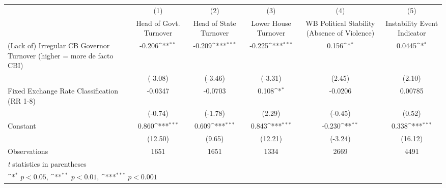 {
\def\sym#1{\ifmmode^{#1}\else\(^{#1}\)\fi}
\begin{tabular}{l*{5}{c}}
\hline\hline
                &\multicolumn{1}{c}{(1)}&\multicolumn{1}{c}{(2)}&\multicolumn{1}{c}{(3)}&\multicolumn{1}{c}{(4)}&\multicolumn{1}{c}{(5)}\\
                &\multicolumn{1}{c}{Head of Govt. Turnover}&\multicolumn{1}{c}{Head of State Turnover}&\multicolumn{1}{c}{Lower House Turnover}&\multicolumn{1}{c}{WB Political Stability (Absence of Violence)}&\multicolumn{1}{c}{Instability Event Indicator}\\
\hline
(Lack of) Irregular CB Governor Turnover (higher = more de facto CBI)&   -0.206\sym{**} &   -0.209\sym{***}&   -0.225\sym{***}&    0.156\sym{*}  &   0.0445\sym{*}  \\
                &  (-3.08)         &  (-3.46)         &  (-3.31)         &   (2.45)         &   (2.10)         \\
[1em]
Fixed Exchange Rate Classification (RR 1-8)&  -0.0347         &  -0.0703         &    0.108\sym{*}  &  -0.0206         &  0.00785         \\
                &  (-0.74)         &  (-1.78)         &   (2.29)         &  (-0.45)         &   (0.52)         \\
[1em]
Constant        &    0.860\sym{***}&    0.609\sym{***}&    0.843\sym{***}&   -0.230\sym{**} &    0.338\sym{***}\\
                &  (12.50)         &   (9.65)         &  (12.21)         &  (-3.24)         &  (16.12)         \\
\hline
Observations    &     1651         &     1651         &     1334         &     2669         &     4491         \\
\hline\hline
\multicolumn{6}{l}{\footnotesize \textit{t} statistics in parentheses}\\
\multicolumn{6}{l}{\footnotesize \sym{*} \(p<0.05\), \sym{**} \(p<0.01\), \sym{***} \(p<0.001\)}\\
\end{tabular}
}

